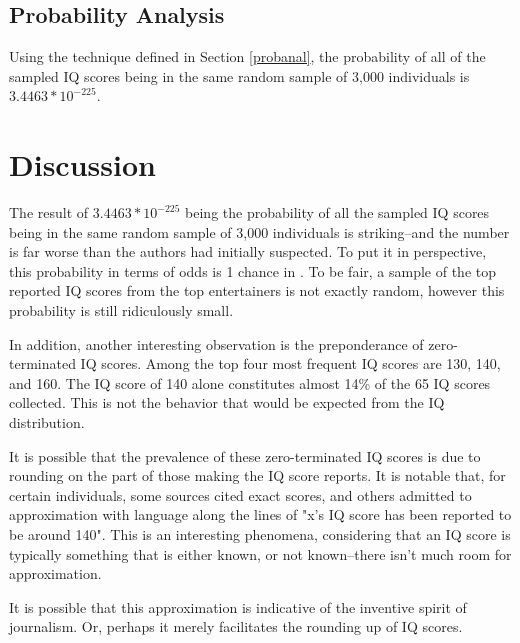 \documentclass[12pt,letterpaper,titlepage,oneside]{article}
\begin{document}
\subsection{Probability Analysis}
Using the technique defined in Section \ref{probanal}, the probability of all of the sampled IQ scores being in the same random sample of 3,000 individuals is $3.4463 * 10^{-225}$.

\section{Discussion}
The result of $3.4463 * 10^{-225}$ being the probability of all the sampled IQ scores being in the same random sample of 3,000 individuals is striking--and the number is far worse than the authors had initially suspected. To put it in perspective, this probability in terms of odds is 1 chance in . To be fair, a sample of the top reported IQ scores from the top entertainers is not exactly random, however this probability is still ridiculously small.

In addition, another interesting observation is the preponderance of zero-terminated IQ scores. Among the top four most frequent IQ scores are 130, 140, and 160. The IQ score of 140 alone constitutes almost 14\% of the 65 IQ scores collected. This is not the behavior that would be expected from the IQ distribution.  

It is possible that the prevalence of these zero-terminated IQ scores is due to rounding on the part of those making the IQ score reports. It is notable that, for certain individuals, some sources cited exact scores, and others admitted to approximation with language along the lines of "x's IQ score has been reported to be around 140". This is an interesting phenomena, considering that an IQ score is typically something that is either known, or not known--there isn't much room for approximation.

It is possible that this approximation is indicative of the inventive spirit of journalism. Or, perhaps it merely facilitates the rounding up of IQ scores.
\end{document}
